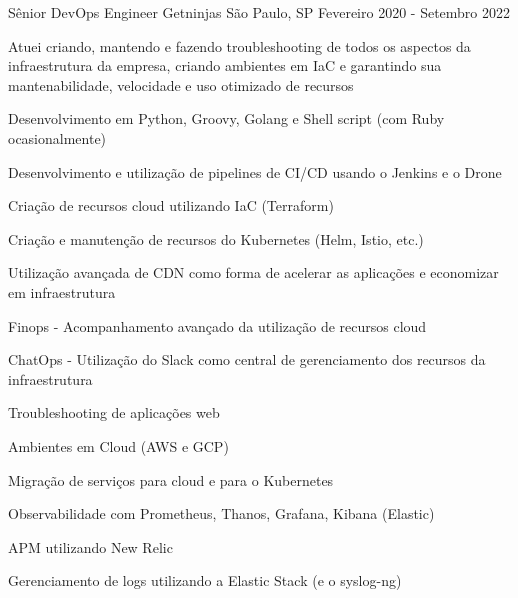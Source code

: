 \begin{cventries}
\cventry
{Sênior DevOps Engineer} %
{Getninjas} %
{São Paulo, SP} %
{Fevereiro 2020 - Setembro 2022} %
{
  \begin{cvitems} %
   \item {Atuei criando, mantendo e fazendo troubleshooting de todos os aspectos da infraestrutura da empresa, criando ambientes em IaC e garantindo sua mantenabilidade, velocidade e uso otimizado de recursos}
   \item {Desenvolvimento em Python, Groovy, Golang e Shell script (com Ruby ocasionalmente)}
   \item {Desenvolvimento e utilização de pipelines de CI/CD usando o Jenkins e o Drone}
   \item {Criação de recursos cloud utilizando IaC (Terraform)}
   \item {Criação e manutenção de recursos do Kubernetes (Helm, Istio, etc.)}
   \item {Utilização avançada de CDN como forma de acelerar as aplicações e economizar em infraestrutura}
   \item {Finops - Acompanhamento avançado da utilização de recursos cloud}
   \item {ChatOps - Utilização do Slack como central de gerenciamento dos recursos da infraestrutura}
   \item {Troubleshooting de aplicações web}
   \item {Ambientes em Cloud (AWS e GCP)}
   \item {Migração de serviços para cloud e para o Kubernetes}
   \item {Observabilidade com Prometheus, Thanos, Grafana, Kibana (Elastic)}
   \item {APM utilizando New Relic}
   \item {Gerenciamento de logs utilizando a Elastic Stack (e o syslog-ng)}
  \end{cvitems}
}


\end{cventries}
